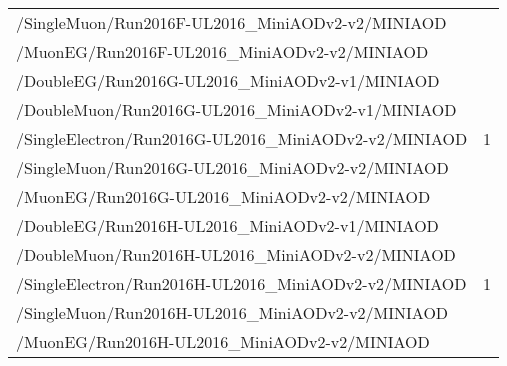 \begin{table}[h]
\begin{tabular}{|lc|}
        /SingleMuon/Run2016F-UL2016\_MiniAODv2-v2/MINIAOD	& \\
        /MuonEG/Run2016F-UL2016\_MiniAODv2-v2/MINIAOD	& \\
        \hline
        /DoubleEG/Run2016G-UL2016\_MiniAODv2-v1/MINIAOD & \multirow{5}{*}{1} \\  %
        /DoubleMuon/Run2016G-UL2016\_MiniAODv2-v1/MINIAOD	& \\
        /SingleElectron/Run2016G-UL2016\_MiniAODv2-v2/MINIAOD	& \\
        /SingleMuon/Run2016G-UL2016\_MiniAODv2-v2/MINIAOD	& \\
        /MuonEG/Run2016G-UL2016\_MiniAODv2-v2/MINIAOD	& \\
        \hline
        /DoubleEG/Run2016H-UL2016\_MiniAODv2-v1/MINIAOD & \multirow{5}{*}{1} \\  %
        /DoubleMuon/Run2016H-UL2016\_MiniAODv2-v2/MINIAOD	& \\
        /SingleElectron/Run2016H-UL2016\_MiniAODv2-v2/MINIAOD	& \\
        /SingleMuon/Run2016H-UL2016\_MiniAODv2-v2/MINIAOD	& \\
        /MuonEG/Run2016H-UL2016\_MiniAODv2-v2/MINIAOD	& \\
        \hline
		\end{tabular}
	\label{table:2016_dataSamples}
\end{table}
